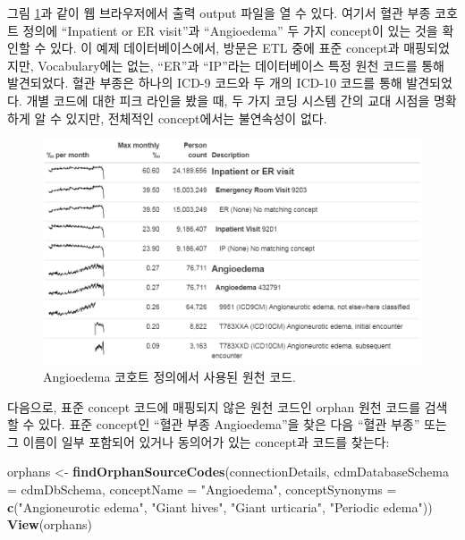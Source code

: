 \documentclass[10.5pt]{book}
\newenvironment{Shaded}{\begin{snugshade}}{\end{snugshade}}
\newcommand{\KeywordTok}[1]{\textcolor[rgb]{0.13,0.29,0.53}{\textbf{#1}}}
\newcommand{\DataTypeTok}[1]{\textcolor[rgb]{0.13,0.29,0.53}{#1}}
\newcommand{\StringTok}[1]{\textcolor[rgb]{0.31,0.60,0.02}{#1}}
\newcommand{\NormalTok}[1]{#1}
\theoremstyle{definition}
\theoremstyle{definition}
\theoremstyle{definition}
\theoremstyle{remark}
\begin{document}
그림 \ref{fig:sourceCodesAngioedema}과 같이 웹 브라우저에서 출력 output
파일을 열 수 있다. 여기서 혈관 부종 코호트 정의에 ``Inpatient or ER
visit''과 ``Angioedema'' 두 가지 concept이 있는 것을 확인할 수 있다. 이
예제 데이터베이스에서, 방문은 ETL 중에 표준 concept과 매핑되었지만,
Vocabulary에는 없는, ``ER''과 ``IP''라는 데이터베이스 특정 원천 코드를
통해 발견되었다. 혈관 부종은 하나의 ICD-9 코드와 두 개의 ICD-10 코드를
통해 발견되었다. 개별 코드에 대한 피크 라인을 봤을 때, 두 가지 코딩
시스템 간의 교대 시점을 명확하게 알 수 있지만, 전체적인 concept에서는
불연속성이 없다.

\begin{figure}

{\centering \includegraphics[width=1\linewidth]{images/DataQuality/sourceCodesAngioedema} 

}

\caption{Angioedema 코호트 정의에서 사용된 원천 코드.}\label{fig:sourceCodesAngioedema}
\end{figure}

다음으로, 표준 concept 코드에 매핑되지 않은 원천 코드인 orphan 원천
코드를 검색할 수 있다. 표준 concept인 ``혈관 부종 Angioedema''을 찾은
다음 ``혈관 부종'' 또는 그 이름이 일부 포함되어 있거나 동의어가 있는
concept과 코드를 찾는다:

\begin{Shaded}
\begin{Highlighting}[]
\NormalTok{orphans <-}\StringTok{ }\KeywordTok{findOrphanSourceCodes}\NormalTok{(connectionDetails,}
                                 \DataTypeTok{cdmDatabaseSchema =}\NormalTok{ cdmDbSchema,}
                                 \DataTypeTok{conceptName =} \StringTok{"Angioedema"}\NormalTok{,}
                                 \DataTypeTok{conceptSynonyms =} \KeywordTok{c}\NormalTok{(}\StringTok{"Angioneurotic edema"}\NormalTok{,}
                                                     \StringTok{"Giant hives"}\NormalTok{,}
                                                     \StringTok{"Giant urticaria"}\NormalTok{,}
                                                     \StringTok{"Periodic edema"}\NormalTok{))}
\KeywordTok{View}\NormalTok{(orphans)}
\end{Highlighting}
\end{Shaded}
\end{document}
